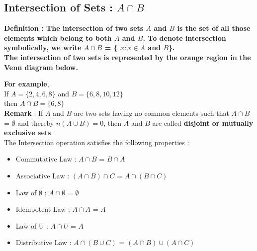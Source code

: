\documentclass[12pt, letterpaper]{article}
\begin{document}
\subsection{Intersection of Sets : $A \cap B$}
\begin{displayquote}
\textbf{Definition : The intersection of two sets $A$ and $B$ is the set of all those elements which belong to both $A$ and $B$. To denote intersection symbolically, we write $A \cap B$ = \{ $x : x \in A$ and $B$\}.\\ 
The intersection of two sets is represented by the orange region in the Venn diagram below.}
\end{displayquote}
\begin{center}
\end{center}
\textbf{For example},\\ 
If $A = \{2,4,6,8\}$ and $B = \{6,8,10,12\}$\\
then $A \cap B = \{6,8\}$\\
\textbf{Remark} : If $A$ and $B$ are two sets having no common elements such that $A \cap B$ = $\emptyset$ and thereby $n(A \cup B) = 0$, then $A$ and $B$ are called \textbf{disjoint or mutually exclusive sets}.\\
The Intersection operation satisfies the following properties : 
\begin{itemize}
    \item Commutative Law : $A \cap B$ = $B \cap A$
    \item Associative Law : $(A \cap B) \cap C$ = $A \cap (B \cap C)$
    \item Law of $\emptyset$ : $A \cap \emptyset$ = $\emptyset$
    \item Idempotent Law : $A \cap A$ = $A$
    \item Law of U : $A \cap U$ = $A$
    \item Distributive Law : $A \cap (B \cup C)$ = $(A \cap B) \cup (A \cap C)$
\end{itemize}
\end{document}
